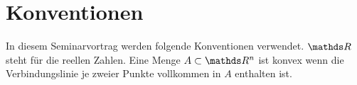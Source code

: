 
\section*{Konventionen}

In diesem Seminarvortrag werden folgende Konventionen verwendet.
$\R$ steht für die reellen Zahlen. Eine Menge $A \subset \R^n$ ist konvex
wenn die Verbindungslinie je zweier Punkte vollkommen in $A$ enthalten ist.










